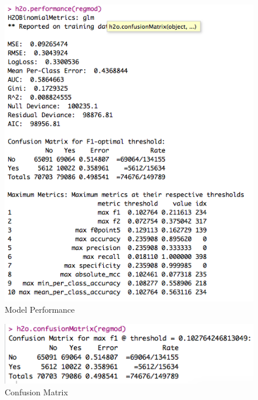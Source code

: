 \documentclass[12pt,twoside]{amherstthesis}
\begin{document}
  \begin{figure}[htbp]
  \centering
  \includegraphics[scale = 0.7,angle = 0]{figure/PerformanceLogMod.png}
  \caption[Model Performance]{\normalsize{Model Performance}}
  \label{fig:Hyarn20}
  \end{figure}
  
  \begin{figure}[htbp]
  \centering
  \includegraphics[scale = 0.8,angle = 0]{figure/confMatLog.png}
  \caption[Confusion Matrix]{\normalsize{Confusion Matrix}}
  \label{fig:Hyarn26}
  \end{figure}
  
\end{document}
